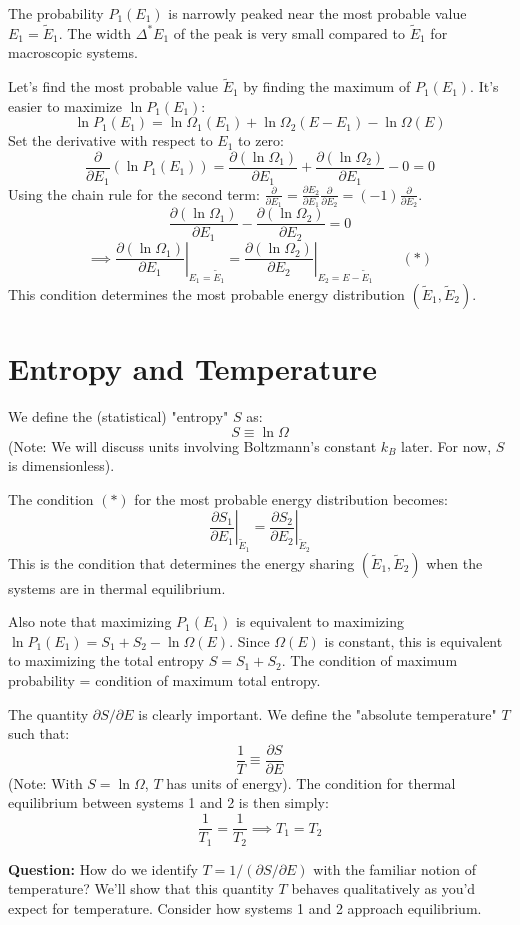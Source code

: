 \documentclass[11pt]{article}
\newcommand{\pderiv}[2]{\frac{\partial #1}{\partial #2}}
\begin{document}
The probability $P_1(E_1)$ is narrowly peaked near the most probable value $E_1 = \tilde{E}_1$. The width $\Delta^* E_1$ of the peak is very small compared to $\tilde{E}_1$ for macroscopic systems.

Let's find the most probable value $\tilde{E}_1$ by finding the maximum of $P_1(E_1)$. It's easier to maximize $\ln P_1(E_1)$:
\[ \ln P_1(E_1) = \ln \Omega_1(E_1) + \ln \Omega_2(E-E_1) - \ln \Omega(E) \]
Set the derivative with respect to $E_1$ to zero:
\[ \pderiv{}{E_1} (\ln P_1(E_1)) = \pderiv{(\ln \Omega_1)}{E_1} + \pderiv{(\ln \Omega_2)}{E_1} - 0 = 0 \]
Using the chain rule for the second term: $\pderiv{}{E_1} = \pderiv{E_2}{E_1} \pderiv{}{E_2} = (-1) \pderiv{}{E_2}$.
\[ \pderiv{(\ln \Omega_1)}{E_1} - \pderiv{(\ln \Omega_2)}{E_2} = 0 \]
\[ \implies \left. \pderiv{(\ln \Omega_1)}{E_1} \right|_{E_1=\tilde{E}_1} = \left. \pderiv{(\ln \Omega_2)}{E_2} \right|_{E_2=E-\tilde{E}_1} \qquad (*) \]
This condition determines the most probable energy distribution $(\tilde{E}_1, \tilde{E}_2)$.

\section*{Entropy and Temperature}

We define the (statistical) "entropy" $S$ as:
\[ S \equiv \ln \Omega \]
(Note: We will discuss units involving Boltzmann's constant $k_B$ later. For now, $S$ is dimensionless).

The condition $(*)$ for the most probable energy distribution becomes:
\[ \left. \pderiv{S_1}{E_1} \right|_{\tilde{E}_1} = \left. \pderiv{S_2}{E_2} \right|_{\tilde{E}_2} \]
This is the condition that determines the energy sharing $(\tilde{E}_1, \tilde{E}_2)$ when the systems are in thermal equilibrium.

Also note that maximizing $P_1(E_1)$ is equivalent to maximizing $\ln P_1(E_1) = S_1 + S_2 - \ln \Omega(E)$. Since $\Omega(E)$ is constant, this is equivalent to maximizing the total entropy $S = S_1 + S_2$.
The condition of maximum probability = condition of maximum total entropy.

The quantity $\partial S / \partial E$ is clearly important. We define the "absolute temperature" $T$ such that:
\[ \frac{1}{T} \equiv \pderiv{S}{E} \]
(Note: With $S = \ln \Omega$, $T$ has units of energy).
The condition for thermal equilibrium between systems 1 and 2 is then simply:
\[ \frac{1}{T_1} = \frac{1}{T_2} \implies T_1 = T_2 \]

\textbf{Question:} How do we identify $T = 1/(\partial S/\partial E)$ with the familiar notion of temperature?
We'll show that this quantity $T$ behaves qualitatively as you'd expect for temperature. Consider how systems 1 and 2 approach equilibrium.
\end{document}
